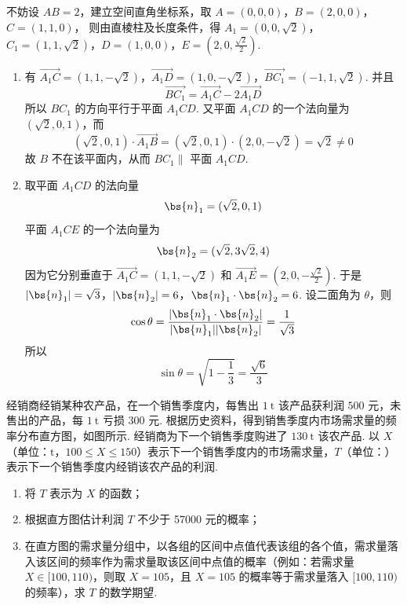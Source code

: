 \begin{solution}
不妨设 \(AB=2\)，建立空间直角坐标系，取
\(A=(0,0,0)\)，\(B=(2,0,0)\)，\(C=(1,1,0)\)，
则由直棱柱及长度条件，得
\(A_1=(0,0,\sqrt2)\)，\(C_1=(1,1,\sqrt2)\)，\(D=(1,0,0)\)，\(E=(2,0,\tfrac{\sqrt2}{2})\).
\begin{enumerate}
\item 有
\(\overrightarrow{A_1C}=(1,1,-\sqrt2)\)，\(\overrightarrow{A_1D}=(1,0,-\sqrt2)\)，\(\overrightarrow{BC_1}=(-1,1,\sqrt2)\).
并且
\[
\overrightarrow{BC_1}=\overrightarrow{A_1C}-2\overrightarrow{A_1D}
\]
所以 \(BC_1\) 的方向平行于平面 \(A_1CD\). 又平面 \(A_1CD\) 的一个法向量为 \((\sqrt2,0,1)\)，而
\[
(\sqrt2,0,1)\cdot\overrightarrow{A_1B}=(\sqrt2,0,1)\cdot(2,0,-\sqrt2)=\sqrt2\ne0
\]
故 \(B\) 不在该平面内，从而 \(BC_1\parallel\) 平面 \(A_1CD\).

\item 取平面 \(A_1CD\) 的法向量
\[
\bs{n}_1=(\sqrt2,0,1)
\]
平面 \(A_1CE\) 的一个法向量为
\[
\bs{n}_2=(\sqrt2,3\sqrt2,4)
\]
因为它分别垂直于 \(\overrightarrow{A_1C}=(1,1,-\sqrt2)\) 和 \(\overrightarrow{A_1E}=(2,0,-\frac{\sqrt2}{2})\). 于是
\(|\bs{n}_1|=\sqrt3\)，\(|\bs{n}_2|=6\)，\(\bs{n}_1\cdot\bs{n}_2=6\).
设二面角为 \(\theta\)，则
\[
\cos\theta=\frac{|\bs{n}_1\cdot\bs{n}_2|}{|\bs{n}_1||\bs{n}_2|}=\frac1{\sqrt3}
\]
所以
\[
\sin\theta=\sqrt{1-\frac13}=\frac{\sqrt6}{3}
\]
\end{enumerate}
\end{solution}

\begin{problem}
经销商经销某种农产品，在一个销售季度内，每售出 \(1\mathrm{~t}\) 该产品获利润 \(500\text{ 元}\)，未售出的产品，每 \(1\mathrm{~t}\) 亏损 \(300\text{ 元}\). 根据历史资料，得到销售季度内市场需求量的频率分布直方图，如图所示. 经销商为下一个销售季度购进了 \(130\mathrm{~t}\) 该农产品. 以 \(X\)（单位：\(\mathrm{t}\)，\(100 \leqslant X \leqslant 150\)）表示下一个销售季度内的市场需求量，\(T\)（单位：）表示下一个销售季度内经销该农产品的利润.

\begin{enumerate}
\item 将 \(T\) 表示为 \(X\) 的函数；
\item 根据直方图估计利润 \(T\) 不少于 57000 元的概率；
\item 在直方图的需求量分组中，以各组的区间中点值代表该组的各个值，需求量落入该区间的频率作为需求量取该区间中点值的概率（例如：若需求量 \(X \in [100, 110)\)，则取 \(X = 105\)，且 \(X = 105\) 的概率等于需求量落入 \([100, 110)\) 的频率），求 \(T\) 的数学期望.
\end{enumerate}

\end{problem}

